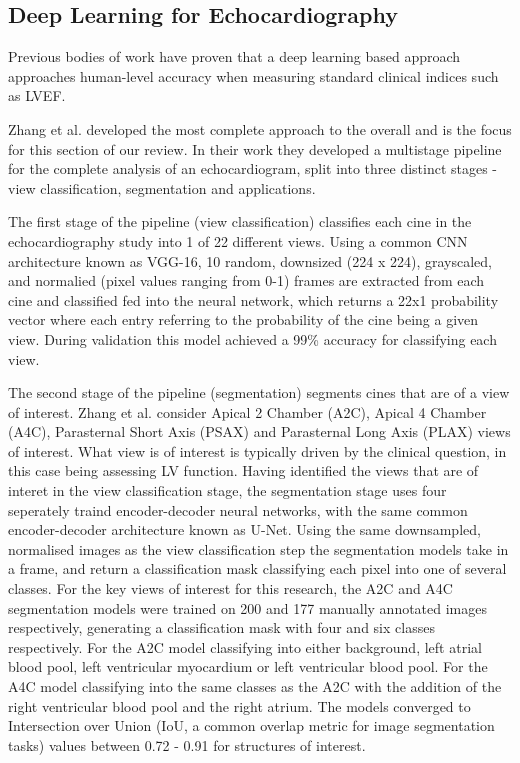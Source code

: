 \subsection{Deep Learning for Echocardiography}

Previous bodies of work \cite{zhangFullyAutomatedEchocardiogram2018}
\cite{leclercDeepLearningSegmentation2019} \cite{hewitt2019artificial} have
proven that a deep learning based approach approaches human-level accuracy when
measuring standard clinical indices such as LVEF. \newline

Zhang et al. developed the most complete approach to the overall and is the
focus for this section of our review. In their work they developed a multistage
pipeline for the complete analysis of an echocardiogram, split into three
distinct stages - view classification, segmentation and applications. \newline

The first stage of the pipeline (view classification) classifies each cine in
the echocardiography study into 1 of 22 different views. Using a common CNN
architecture known as VGG-16, 10 random, downsized (224 x 224), grayscaled, and
normalied (pixel values ranging from 0-1) frames are extracted from each cine
and classified fed into the neural network, which returns a 22x1 probability
vector where each entry referring to the probability of the cine being a given
view. During validation this model achieved a 99\% accuracy for classifying each
view.
\newline

The second stage of the pipeline (segmentation) segments cines that are of a
view of interest. Zhang et al. consider Apical 2 Chamber (A2C), Apical 4 Chamber
(A4C), Parasternal Short Axis (PSAX) and Parasternal Long Axis (PLAX) views of
interest. What view is of interest is typically driven by the clinical question,
in this case being assessing LV function. Having identified the views that are
of interet in the view classification stage, the segmentation stage uses four
seperately traind encoder-decoder neural networks, with the same common
encoder-decoder architecture known as U-Net. Using the same downsampled,
normalised images as the view classification step the segmentation models take
in a frame, and return a classification mask classifying each pixel into one of
several classes. For the key views of interest for this research, the A2C and
A4C segmentation models were trained on 200 and 177 manually annotated images
respectively, generating a classification mask with four and six classes
respectively. For the A2C model classifying into either background, left atrial
blood pool, left ventricular myocardium or left ventricular blood pool. For the
A4C model classifying into the same classes as the A2C with the addition of the
right ventricular blood pool and the right atrium. The models converged to
Intersection over Union (IoU, a common overlap metric for image segmentation
tasks) values between 0.72 - 0.91 for structures of interest. \newline


